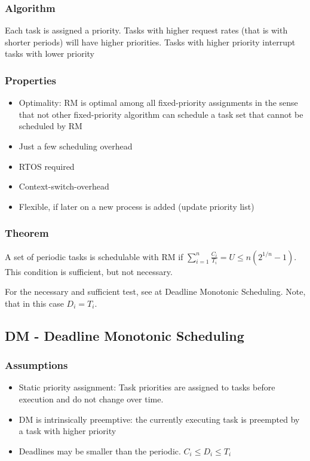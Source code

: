 \subsubsection{Algorithm}
Each task is assigned a priority. Tasks with 
higher request rates (that is with shorter periods) will have 
higher priorities. Tasks with higher priority interrupt tasks 
with lower priority

\subsubsection{Properties}
\begin{itemize}[noitemsep]
\item Optimality: RM is optimal among all fixed-priority 
assignments in the sense that not other fixed-priority 
algorithm can schedule a task set that cannot be 
scheduled by RM
\item Just a few scheduling overhead
\item RTOS required
\item Context-switch-overhead
\item Flexible, if later on a new process is added (update priority list)
\end{itemize}

\subsubsection{Theorem}
\begin{theorem}
A set of periodic tasks is schedulable with RM if $\sum\limits_{i = 1}^{n} \frac{C_i}{T_i} = U \leq n(2^{1/n} -1)$. This condition is sufficient, but not necessary.
\end{theorem}

\begin{theorem}
For the necessary and sufficient test, see at Deadline Monotonic Scheduling. Note, that in this case $D_i = T_i$.
\end{theorem}



\subsection{DM - Deadline Monotonic Scheduling}

\subsubsection{Assumptions}
\begin{itemize}[noitemsep]
\item Static priority assignment: Task priorities are assigned to tasks before execution and do 
not change over time.
\item DM is intrinsically preemptive: the currently executing task is 
preempted by a task with higher priority
\item Deadlines may be smaller than the periodic. $C_i \leq D_i \leq T_i$
\end{itemize}

